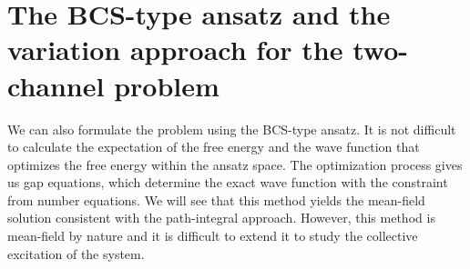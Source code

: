 \chapter{The BCS-type ansatz and the variation approach for the two-channel problem \label{ch:mean}}
We can also formulate the problem  using the  BCS-type ansatz.  It is not difficult to calculate  the expectation of the free energy and  the wave function that optimizes the free energy within the ansatz space.  The optimization process gives us gap equations, which determine the exact wave function with the constraint from number equations.   %
We will see that this method yields  the mean-field solution consistent with the path-integral approach.  However, this method is mean-field by nature and it is difficult  to extend it to study the collective excitation of the system.  

